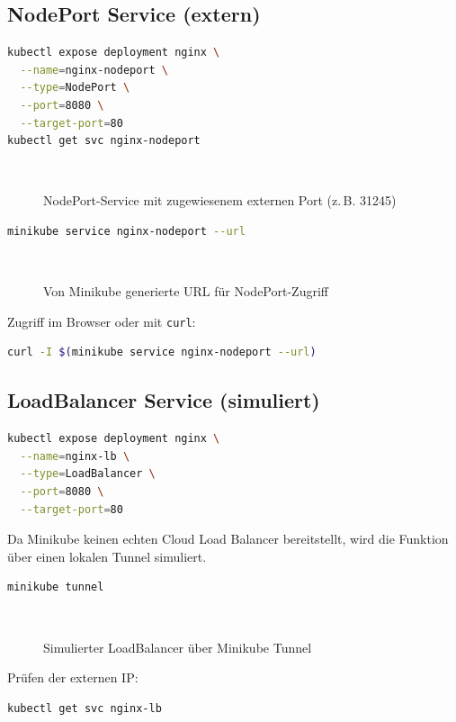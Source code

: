 \documentclass[11pt,a4paper,twocolumn]{article}
\newcommand{\placeholderfig}[2]{%
  \begin{figure}[H]\centering
    \fbox{\rule{0pt}{0.3\linewidth}\rule{0.9\linewidth}{0pt}}\\[2mm]
    \caption{#1}\label{fig:#2}
  \end{figure}}
\begin{document}
\subsection{NodePort Service (extern)}

\begin{lstlisting}[language=bash,caption={Erstellung eines NodePort-Service}]
kubectl expose deployment nginx \
  --name=nginx-nodeport \
  --type=NodePort \
  --port=8080 \
  --target-port=80
kubectl get svc nginx-nodeport
\end{lstlisting}

\placeholderfig{NodePort-Service mit zugewiesenem externen Port (z.\,B. 31245)}{nodeport-created}

\begin{lstlisting}[language=bash,caption={Abrufen der externen URL über Minikube}]
minikube service nginx-nodeport --url
\end{lstlisting}

\placeholderfig{Von Minikube generierte URL für NodePort-Zugriff}{minikube-url}

Zugriff im Browser oder mit \texttt{curl}:
\begin{lstlisting}[language=bash]
curl -I $(minikube service nginx-nodeport --url)
\end{lstlisting}

\subsection{LoadBalancer Service (simuliert)}

\begin{lstlisting}[language=bash,caption={Erstellung eines LoadBalancer-Service}]
kubectl expose deployment nginx \
  --name=nginx-lb \
  --type=LoadBalancer \
  --port=8080 \
  --target-port=80
\end{lstlisting}

Da Minikube keinen echten Cloud Load Balancer bereitstellt, wird die Funktion über einen lokalen Tunnel simuliert.

\begin{lstlisting}[language=bash,caption={Start des Minikube Tunnels (neues Terminal)}]
minikube tunnel
\end{lstlisting}

\placeholderfig{Simulierter LoadBalancer über Minikube Tunnel}{minikube-tunnel}

Prüfen der externen IP:
\begin{lstlisting}[language=bash]
kubectl get svc nginx-lb
\end{lstlisting}
\end{document}
